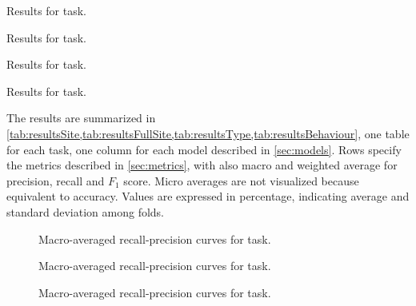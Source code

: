 \begin{table}
  \centering
  \caption{Results for \site{} task.}
  \label{tab:resultsSite}
  \footnotesize
  
\end{table}

\begin{table}
  \centering
  \caption{Results for \fullSite{} task.}
  \label{tab:resultsFullSite}
  \footnotesize
  
\end{table}

\begin{table}
  \centering
  \caption{Results for \type{} task.}
  \label{tab:resultsType}
  \footnotesize
  
\end{table}

\begin{table}
  \centering
  \caption{Results for \behaviour{} task.}
  \label{tab:resultsBehaviour}
  \footnotesize
  
\end{table}

The results are summarized in
\cref{tab:resultsSite,tab:resultsFullSite,tab:resultsType,tab:resultsBehaviour},
one table for each task, one column for each 
model described in \cref{sec:models}. Rows specify the metrics
described in \cref{sec:metrics}, with also macro and weighted average
for precision, recall and $F_1$ score. Micro averages are not
visualized because equivalent to accuracy. Values are expressed in
percentage, indicating average and standard deviation among folds.

\begin{figure}
  \centering
  \resizebox{0.9\textwidth}{!}{}
  \caption{Macro-averaged recall-precision curves for \site{} task.}
  \label{fig:curvesSite}
\end{figure}

\begin{figure}
  \centering
  \resizebox{0.9\textwidth}{!}{}
  \caption{Macro-averaged recall-precision curves for \fullSite{} task.}
  \label{fig:curvesFullSite}
\end{figure}

\begin{figure}
  \centering
  \resizebox{0.9\textwidth}{!}{}
  \caption{Macro-averaged recall-precision curves for \type{} task.}
  \label{fig:curvesType}
\end{figure}

